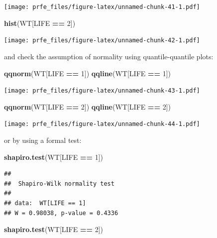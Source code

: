 \documentclass[12pt,]{book}
\newenvironment{Shaded}{\begin{snugshade}}{\end{snugshade}}
\newcommand{\KeywordTok}[1]{\textcolor[rgb]{0.13,0.29,0.53}{\textbf{#1}}}
\newcommand{\DecValTok}[1]{\textcolor[rgb]{0.00,0.00,0.81}{#1}}
\newcommand{\StringTok}[1]{\textcolor[rgb]{0.31,0.60,0.02}{#1}}
\newcommand{\OperatorTok}[1]{\textcolor[rgb]{0.81,0.36,0.00}{\textbf{#1}}}
\newcommand{\NormalTok}[1]{#1}
\theoremstyle{definition}
\theoremstyle{definition}
\theoremstyle{definition}
\theoremstyle{remark}
\begin{document}
\texttt{[image: prfe\_files/figure-latex/unnamed-chunk-41-1.pdf]}

\begin{Shaded}
\begin{Highlighting}[]
\KeywordTok{hist}\NormalTok{(WT[LIFE }\OperatorTok{==}\StringTok{ }\DecValTok{2}\NormalTok{])}
\end{Highlighting}
\end{Shaded}

\texttt{[image: prfe\_files/figure-latex/unnamed-chunk-42-1.pdf]}

and check the assumption of normality using quantile-quantile plots:

\begin{Shaded}
\begin{Highlighting}[]
\KeywordTok{qqnorm}\NormalTok{(WT[LIFE }\OperatorTok{==}\StringTok{ }\DecValTok{1}\NormalTok{])}
\KeywordTok{qqline}\NormalTok{(WT[LIFE }\OperatorTok{==}\StringTok{ }\DecValTok{1}\NormalTok{])}
\end{Highlighting}
\end{Shaded}

\texttt{[image: prfe\_files/figure-latex/unnamed-chunk-43-1.pdf]}

\begin{Shaded}
\begin{Highlighting}[]
\KeywordTok{qqnorm}\NormalTok{(WT[LIFE }\OperatorTok{==}\StringTok{ }\DecValTok{2}\NormalTok{])}
\KeywordTok{qqline}\NormalTok{(WT[LIFE }\OperatorTok{==}\StringTok{ }\DecValTok{2}\NormalTok{])}
\end{Highlighting}
\end{Shaded}

\texttt{[image: prfe\_files/figure-latex/unnamed-chunk-44-1.pdf]}

or by using a formal test:

\begin{Shaded}
\begin{Highlighting}[]
\KeywordTok{shapiro.test}\NormalTok{(WT[LIFE }\OperatorTok{==}\StringTok{ }\DecValTok{1}\NormalTok{])}
\end{Highlighting}
\end{Shaded}

\begin{verbatim}
## 
##  Shapiro-Wilk normality test
## 
## data:  WT[LIFE == 1]
## W = 0.98038, p-value = 0.4336
\end{verbatim}

\begin{Shaded}
\begin{Highlighting}[]
\KeywordTok{shapiro.test}\NormalTok{(WT[LIFE }\OperatorTok{==}\StringTok{ }\DecValTok{2}\NormalTok{])}
\end{Highlighting}
\end{Shaded}
\end{document}
